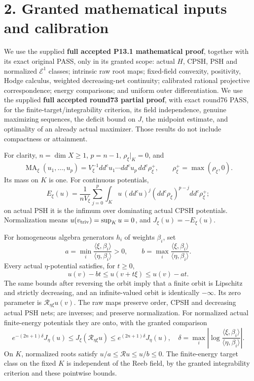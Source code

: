 \documentclass[
  10pt,
]{article}
\begin{document}
\section{2. Granted mathematical inputs and
calibration}\label{granted-mathematical-inputs-and-calibration}

We use the supplied \textbf{full accepted P13.1 mathematical proof},
together with its exact original PASS, only in its granted scope: actual
\(H\), CPSH, PSH and normalized \(\mathcal E^1\) classes; intrinsic raw
root maps; fixed-field convexity, positivity, Hodge calculus, weighted
decreasing-net continuity; calibrated rational projective
correspondence; energy comparisons; and uniform outer differentiation.
We use the supplied \textbf{full accepted round73 partial proof}, with
exact round76 PASS, for the finite-target/integrability criterion, its
field independence, genuine maximizing sequences, the deficit bound on
\(J\), the midpoint estimate, and optimality of an already actual
maximizer. Those results do not include compactness or attainment.

For clarity, \(n=\dim X\ge1\), \(p=n-1\), \(\rho_\xi|_K=0\), and \[
\operatorname{MA}_\xi(u_1,\ldots,u_p)
 =V_\xi^{-1}dd^cu_1\cdots dd^cu_p\,dd^c\rho_\xi^+,
\qquad \rho_\xi^+=\max(\rho_\xi,0).                                      \tag{2.1}
\] Its mass on \(K\) is one. For continuous potentials, \[
E_\xi(u)=\frac1{nV_\xi}\sum_{j=0}^p\int_Ku\,(dd^cu)^j
                 (dd^c\rho_\xi)^{p-j}dd^c\rho_\xi^+;                    \tag{2.2}
\] on actual PSH it is the infimum over dominating actual CPSH
potentials. Normalization means \(u(v_{\rm triv})=\sup_Ku=0\), and
\(J_\xi(u)=-E_\xi(u)\).

For homogeneous algebra generators \(h_i\) of weights \(\beta_i\), set
\[
a=\min_i\frac{\langle\xi,\beta_i\rangle}{\langle\eta,\beta_i\rangle}>0,
\qquad b=\max_i\frac{\langle\xi,\beta_i\rangle}{\langle\eta,\beta_i\rangle}.
\] Every actual \(\eta\)-potential satisfies, for \(t\ge0\), \[
u(v)-bt\le u(v+t\xi)\le u(v)-at.                              \tag{2.3}
\] The same bounds after reversing the orbit imply that a finite orbit
is Lipschitz and strictly decreasing, and an infinite-valued orbit is
identically \(-\infty\). Its zero parameter is
\(\mathcal R_{\eta\xi}u(v)\). The raw maps preserve order, CPSH and
decreasing actual PSH nets; are inverses; and preserve normalization.
For normalized actual finite-energy potentials they are onto, with the
granted comparison \[
e^{-(2n+1)\delta}J_\eta(u)\le
J_\xi(\mathcal R_{\eta\xi}u)\le e^{(2n+1)\delta}J_\eta(u),
\quad \delta=\max_i\left|\log\frac{\langle\xi,\beta_i\rangle}{\langle\eta,\beta_i\rangle}\right|.  \tag{2.4}
\] On \(K\), normalized roots satisfy \(u/a\le\mathcal R u\le u/b\le0\).
The finite-energy target class on the fixed \(K\) is independent of the
Reeb field, by the granted integrability criterion and these pointwise
bounds.
\end{document}

